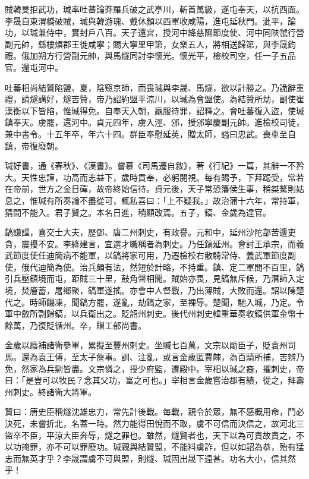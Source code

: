 \begin{pinyinscope}
 賊韓旻拒武功，瑊率吐蕃論莽羅兵破之武亭川，斬首萬級，遂屯奉天，以抗西面。李晟自東渭橋破賊，瑊與韓游瑰、戴休顏以西軍收咸陽，進屯延秋門。泚平，論功，以瑊兼侍中，實封戶八百。天子還宮，授河中絳慈隰節度使、河中同陜虢行營副元帥，繇樓煩郡王徙咸寧；賜大寧里甲第，女樂五人，將相送歸第，與李晟鈞禮。俄加朔方行營副元帥，與馬燧同討李懷光。懷光平，檢校司空，任一子五品官。還屯河中。



 吐蕃相尚結贊陷鹽、夏，陰窺京師，而畏瑊與李晟、馬燧，欲以計勝之。乃詭辭重禮，請燧講好，燧苦贊，帝乃詔約盟平涼川，以瑊為會盟使。為結贊所劫，副使崔漢衡以下皆陷，惟瑊得免。自奉天入朝，羸服待罪，詔釋之。會吐蕃復入盜，使瑊鎮奉天。虜罷，還河中。貞元四年，虜入涇、邠，授邠寧慶副元帥。進檢校司徒，兼中書令。十五年卒，年六十四。群臣奉慰延英，贈太師，謚曰忠武。喪車至自鎮，帝復廢朝。



 瑊好書，通《春秋》、《漢書》。嘗慕《司馬遷自敘》，著《行紀》一篇，其辭一不矜大。天性忠謹，功高而志益下，歲時貢奉，必躬閱視。每有賜予，下拜跽受，常若在帝前，世方之金日磾，故帝終始信待。貞元後，天子常恐籓侯生事，稍桀驁則姑息之，惟瑊有所奏論不盡從可，輒私喜曰：「上不疑我。」故治蒲十六年，常持軍，猜間不能入。君子賢之。本名日進，稍顯改焉。五子，鎬、金歲為達官。



 鎬謙謹，喜交士大夫，歷鄧、唐二州刺史，有政譽。元和中，延州沙陀部苦邊吏貪，震擾不安。李絳建言，宜選才職稱者為刺史。乃任鎬延州。會討王承宗，而義武節度使任迪簡病不能軍，以鎬將家可用，乃遷檢校右散騎常侍、義武軍節度副使，俄代迪簡為使。治兵頗有法，然短於計略，不持重。鎮、定二軍間不百里，鎬引兵壓鎮境而屯，距賊三十里，鼓角聲相聞。賊始亦畏，見鎬無斥候，乃潛師入定境，焚廥蓄，屠鄉聚，鎬軍遂搖。亦會中人督戰，乃出薄賊，大敗而還。詔以陳楚代之。時師饑凍，聞鎬方罷，遂亂，劫鎬之家，至裸辱。楚聞，馳入城，乃定。令軍中斂所剽歸鎬，以兵衛出之。貶韶州刺史。後代州刺史韓重華奏收鎬供軍金幣十餘萬，乃復貶循州。卒，贈工部尚書。



 金歲以廕補諸衛參軍，累擬至豐州刺史。坐贓七百萬，文宗以勛臣子，貶袁州司馬。還為袁王傅，至太子詹事。訓、注亂，或言金歲匿賈餗，為百騎所捕，苦辨乃免，然家為兵剽皆盡。文宗憐之，授少府監，遷殿中。宰相以瑊之裔，擢刺史，帝曰：「是豈可以牧民？念其父功，富之可也。」宰相言金歲嘗治郡有績，從之，拜壽州刺史。終諸衛大將軍。



 贊曰：唐史臣稱燧沈雄忠力，常先計後戰。每戰，親令於眾，無不感概用命，鬥必決死，未嘗折北，名蓋一時。然力能得田悅而不取，虜不可信而決信之，故河北三盜卒不臣，平涼大臣奔辱，燧之罪也。雖然，燧賢者也，天下以為可責故責之，不以功掩罪，亦不可以罪廢功。瑊親與結贊盟，不能料虜詐，但以如詔為恭，殆有猛志而無英才乎？李晟謂虜不可與盟，則燧、瑊固出晟下遠甚。功名大小，信其然乎！



\end{pinyinscope}